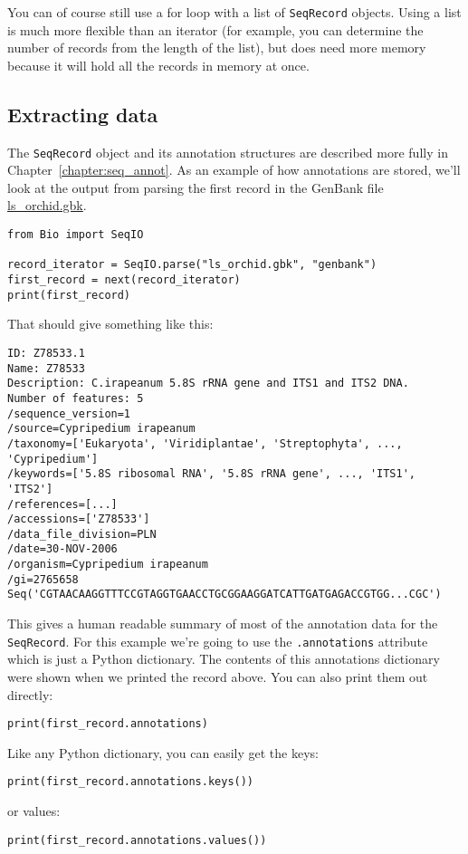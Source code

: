 You can of course still use a for loop with a list of \verb|SeqRecord| objects.  Using a list is much more flexible than an iterator (for example, you can determine the number of records from the length of the list), but does need more memory because it will hold all the records in memory at once.

\subsection{Extracting data}

The \verb|SeqRecord| object and its annotation structures are described more fully in
Chapter~\ref{chapter:seq_annot}.  As an example of how annotations are stored, we'll look at the output from parsing the first record in the GenBank file \href{https://raw.githubusercontent.com/biopython/biopython/master/Doc/examples/ls_orchid.gbk}{ls\_orchid.gbk}.

\begin{verbatim}
from Bio import SeqIO

record_iterator = SeqIO.parse("ls_orchid.gbk", "genbank")
first_record = next(record_iterator)
print(first_record)
\end{verbatim}

\noindent That should give something like this:

\begin{verbatim}
ID: Z78533.1
Name: Z78533
Description: C.irapeanum 5.8S rRNA gene and ITS1 and ITS2 DNA.
Number of features: 5
/sequence_version=1
/source=Cypripedium irapeanum
/taxonomy=['Eukaryota', 'Viridiplantae', 'Streptophyta', ..., 'Cypripedium']
/keywords=['5.8S ribosomal RNA', '5.8S rRNA gene', ..., 'ITS1', 'ITS2']
/references=[...]
/accessions=['Z78533']
/data_file_division=PLN
/date=30-NOV-2006
/organism=Cypripedium irapeanum
/gi=2765658
Seq('CGTAACAAGGTTTCCGTAGGTGAACCTGCGGAAGGATCATTGATGAGACCGTGG...CGC')
\end{verbatim}

This gives a human readable summary of most of the annotation data for the \verb|SeqRecord|.
For this example we're going to use the \verb|.annotations| attribute which is just a Python dictionary.
The contents of this annotations dictionary were shown when we printed the record above.
You can also print them out directly:
\begin{verbatim}
print(first_record.annotations)
\end{verbatim}
\noindent Like any Python dictionary, you can easily get the keys:
\begin{verbatim}
print(first_record.annotations.keys())
\end{verbatim}
\noindent or values:
\begin{verbatim}
print(first_record.annotations.values())
\end{verbatim}

